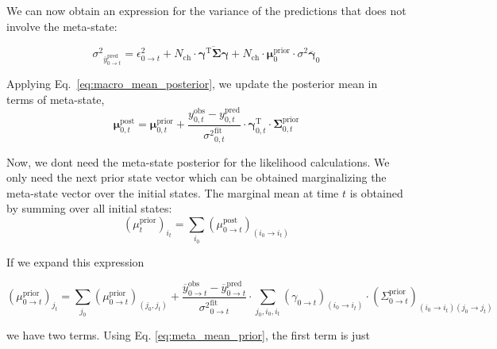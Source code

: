 \documentclass[pdflatex,sn-mathphys-num]{sn-jnl}%
\theoremstyle{thmstyleone}%
\theoremstyle{thmstyletwo}%
\theoremstyle{thmstylethree}%
\begin{document}
We can now obtain an expression for the variance of the predictions that does not involve the meta-state: 

\begin{equation}
	{\sigma^2}_{\overline{y}^{\mathrm{pred}}_{0 \rightarrow t}}
	= \epsilon^2_{0 \rightarrow t} + N_{\mathrm{ch}} \cdot\overline{\mathbf{\gamma}^{\mathrm{T}} \mathbf{\Sigma}\mathbf{\gamma}}
	+ N_{\mathrm{ch}} \cdot \mathbf{\mu}^{\mathrm{prior}}_{0} \cdot {\sigma^2 \overline{\mathbf{\gamma}}}_{0}
	\label{eq:macro_interval_sigma_pred}
\end{equation}



Applying Eq.~\ref{eq:macro_mean_posterior}, we update the posterior mean in terms of meta-state,
\begin{equation}
	\mathbf{\mu}^{\mathrm{post}}_{0, t} = \mathbf{\mu}^{\mathrm{prior}}_{0, t} + 
	\frac{y^{\mathrm{obs}}_{0, t} - y^{\mathrm{pred}}_{0, t}}{{\sigma^2}^{\mathrm{fit}}_{0, t}} 
	\cdot \mathbf{\gamma}^{\mathrm{T}}_{0, t} \cdot \mathbf{\Sigma}^{\mathrm{prior}}_{0, t}
	\label{eq:meta_posterior_mean_update}
\end{equation}

Now, we dont need the meta-state posterior for the likelihood calculations. We only need the next prior state vector which can be obtained marginalizing the meta-state vector over the initial states. The marginal mean at time \( t \) is obtained by summing over all initial states:
\begin{equation}
	(\mu^{\mathrm{prior}}_{t})_{i_t} = \sum_{i_0} (\mu^{\mathrm{post}}_{0 \rightarrow t})_{(i_0 \rightarrow i_t)}
	\label{eq:marginal_prior_mean}
\end{equation}

If we expand this expression

\begin{equation}
	(\mu^{\mathrm{prior}}_{0 \rightarrow t})_{j_{t}} = 
	\sum_{j_0} (\mu^{\mathrm{prior}}_{0 \rightarrow t})_{(j_0, j_{t})} 
	+ \frac{\overline{y}^{\mathrm{obs}}_{0 \rightarrow t} - \overline{y}^{\mathrm{pred}}_{0 \rightarrow t}}{{\sigma^2}^{\mathrm{fit}}_{0 \rightarrow t}} \cdot 
	\sum_{j_0, i_0, i_{t}} (\gamma_{0 \rightarrow t})_{(i_0 \rightarrow i_{t})} \cdot (\Sigma^{\mathrm{prior}}_{0 \rightarrow t})_{(i_0 \rightarrow i_{t})(j_0 \rightarrow j_{t})}
	\label{eq:mu_prior_update_0_to_t}
\end{equation}

we have two terms. Using Eq. \ref{eq:meta_mean_prior}, the first term is just
\end{document}
